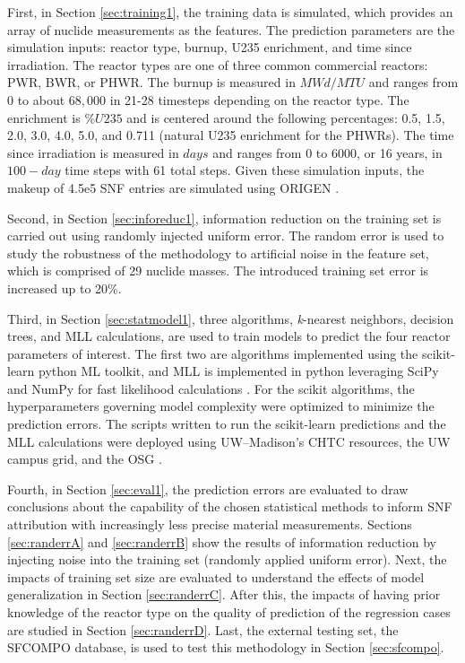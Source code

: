 First, in Section \ref{sec:training1}, the training data is simulated, which
provides an array of nuclide measurements as the features. The prediction
parameters are the simulation inputs: reactor type, burnup, \gls{U235}
enrichment, and time since irradiation.  The reactor types are one of three
common commercial reactors: \gls{PWR}, \gls{BWR}, or \gls{PHWR}.  The burnup is
measured in $MWd/MTU$ and ranges from 0 to about $68,000$ in 21-28 timesteps
depending on the reactor type.  The enrichment is $\%U235$ and is centered
around the following percentages: 0.5, 1.5, 2.0, 3.0, 4.0, 5.0, and 0.711
(natural \gls{U235} enrichment for the \gls{PHWR}s).  The time since
irradiation is measured in $days$ and ranges from 0 to 6000, or 16 years, in
$100-day$ time steps with 61 total steps. Given these simulation inputs, the
makeup of 4.5e5 \gls{SNF} entries are simulated using \gls{ORIGEN} \cite{scale,
origen, origenarp}.

Second, in Section \ref{sec:inforeduc1}, information reduction on the training
set is carried out using randomly injected uniform error. The random error is
used to study the robustness of the methodology to artificial noise in the
feature set, which is comprised of 29 nuclide masses.  The introduced training
set error is increased up to 20\%.

Third, in Section \ref{sec:statmodel1}, three algorithms, \textit{k}-nearest
neighbors, decision trees, and \gls{MLL} calculations, are used to train models
to predict the four reactor parameters of interest.  The first two are
algorithms implemented using the scikit-learn python \gls{ML} toolkit, and
\gls{MLL} is implemented in python leveraging SciPy and NumPy for fast
likelihood calculations \cite{scikit, scipy, numpy}.  For the scikit
algorithms, the hyperparameters governing model complexity were optimized to
minimize the prediction errors.  The scripts written to run the scikit-learn
predictions and the \gls{MLL} calculations were deployed using
\gls{UW}--Madison's \gls{CHTC} resources, the \gls{UW} campus grid, and the
\gls{OSG} \cite{osg07, osg09}.  

Fourth, in Section \ref{sec:eval1}, the prediction errors are evaluated to draw
conclusions about the capability of the chosen statistical methods to inform
\gls{SNF} attribution with increasingly less precise material measurements.
Sections \ref{sec:randerrA} and \ref{sec:randerrB} show the results of
information reduction by injecting noise into the training set (randomly
applied uniform error).  Next, the impacts of training set size are evaluated
to understand the effects of model generalization in Section
\ref{sec:randerrC}. After this, the impacts of having prior knowledge of the
reactor type on the quality of prediction of the regression cases are studied
in Section \ref{sec:randerrD}. Last, the external testing set, the
\gls{SFCOMPO} database, is used to test this methodology in Section
\ref{sec:sfcompo}. 

